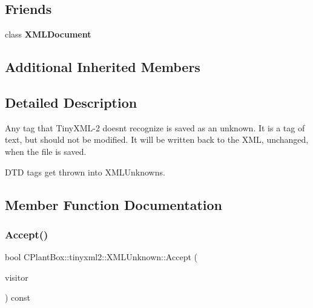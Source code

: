 \subsection*{Friends}
\begin{DoxyCompactItemize}
\item 
\mbox{\label{classCPlantBox_1_1tinyxml2_1_1XMLUnknown_a4eee3bda60c60a30e4e8cd4ea91c4c6e}} 
class {\bfseries X\+M\+L\+Document}
\end{DoxyCompactItemize}
\subsection*{Additional Inherited Members}


\subsection{Detailed Description}
Any tag that Tiny\+X\+M\+L-\/2 doesn\textquotesingle{}t recognize is saved as an unknown. It is a tag of text, but should not be modified. It will be written back to the X\+ML, unchanged, when the file is saved.

D\+TD tags get thrown into X\+M\+L\+Unknowns. 

\subsection{Member Function Documentation}
\mbox{\label{classCPlantBox_1_1tinyxml2_1_1XMLUnknown_a706a5d7b3056facf31ba66a316ddf912}} 
\subsubsection{\texorpdfstring{Accept()}{Accept()}}
{\footnotesize\ttfamily bool C\+Plant\+Box\+::tinyxml2\+::\+X\+M\+L\+Unknown\+::\+Accept (\begin{DoxyParamCaption}\item[{\hyperlink{classCPlantBox_1_1tinyxml2_1_1XMLVisitor}{X\+M\+L\+Visitor} $\ast$}]{visitor }\end{DoxyParamCaption}) const\hspace{0.3cm}{\ttfamily [virtual]}}

